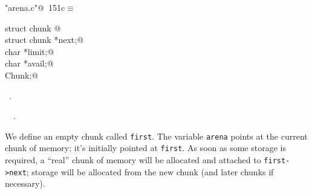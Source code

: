 \documentclass[a4paper]{report}
\begin{document}
\begin{flushleft} \small
\begin{minipage}{\linewidth}\label{scrap338}\raggedright\small
{} \verb@"arena.c"@\nobreak\ {\footnotesize {151c}}$\equiv$
\vspace{-1ex}
\begin{list}{}{} \item
\mbox{}\verb@typedef struct chunk {@\\
\mbox{}\verb@  struct chunk *next;@\\
\mbox{}\verb@  char *limit;@\\
\mbox{}\verb@  char *avail;@\\
\mbox{}\verb@} Chunk;@\\
\mbox{}\verb@@{\NWsep}
\end{list}
\vspace{-1.5ex}
\footnotesize
\begin{list}{}{\setlength{\itemsep}{-\parsep}\setlength{\itemindent}{-\leftmargin}}
\item \NWtxtFileDefBy\ .
\item \NWtxtIdentsDefed\nobreak\  \verb@Chunk@\nobreak\ .
\item{}
\end{list}
\end{minipage}\vspace{4ex}
\end{flushleft}
We define an empty chunk called \verb|first|. The variable \verb|arena| points
at the current chunk of memory; it's initially pointed at \verb|first|.
As soon as some storage is required, a ``real'' chunk of memory will
be allocated and attached to \verb|first->next|; storage will be
allocated from the new chunk (and later chunks if necessary).
\end{document}
